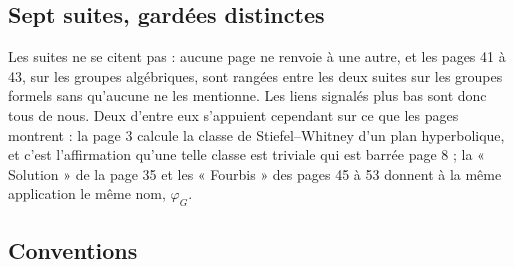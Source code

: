 \documentclass[11pt,a4paper]{article}
\begin{document}
\subsection*{Sept suites, gardées distinctes}

Les suites ne se citent pas : aucune page ne renvoie à une autre, et les
pages 41 à 43, sur les groupes algébriques, sont rangées entre les deux
suites sur les groupes formels sans qu'aucune ne les mentionne. Les liens
signalés plus bas sont donc tous de nous. Deux d'entre eux s'appuient
cependant sur ce que les pages montrent : la page 3 calcule la classe de
Stiefel–Whitney d'un plan hyperbolique, et c'est l'affirmation qu'une telle
classe est triviale qui est barrée page 8 ; la « Solution » de la page 35 et
les « Fourbis » des pages 45 à 53 donnent à la même application le même nom,
$\varphi_G$.

\subsection*{Conventions}
\end{document}
